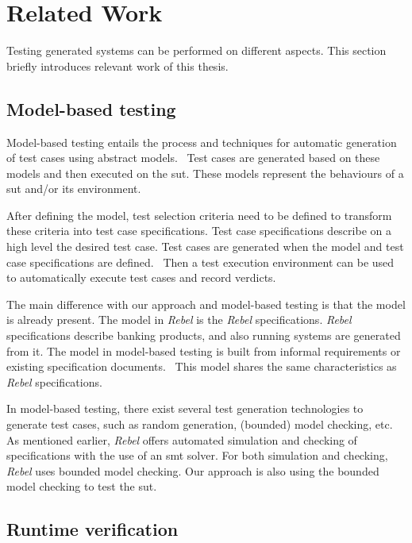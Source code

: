 \section{Related Work}

Testing generated systems can be performed on different aspects. This section
briefly introduces relevant work of this thesis.

\subsection*{Model-based testing}

Model-based testing entails the process and techniques for automatic generation
of test cases using abstract models.~\cite{utting2012taxonomy, tretmans2008model, dalal1999model}
Test cases are generated based on these models and then executed on the
\gls{sut}. These models represent the behaviours of a \gls{sut} and/or its
environment.~\cite{utting2012taxonomy, tretmans2008model}

After defining the model, test selection criteria need to be defined to
transform these criteria into test case specifications. Test case specifications
describe on a high level the desired test case. Test cases are generated when
the model and test case specifications are defined.~\cite{utting2012taxonomy}
Then a test execution environment can be used to automatically execute test
cases and record verdicts.

The main difference with our approach and model-based testing is that the model
is already present. The model in \textit{Rebel} is the \textit{Rebel}
specifications. \textit{Rebel} specifications describe banking products, and
also running systems are generated from it. The model in model-based testing is
built from informal requirements or existing specification
documents.~\cite[p.~2]{utting2012taxonomy} This model
shares the same characteristics as \textit{Rebel} specifications.

In model-based testing, there exist several test generation technologies to
generate test cases, such as random generation, (bounded) model checking,
etc.~\cite[p.~8-9]{utting2012taxonomy}
As mentioned earlier, \textit{Rebel} offers automated simulation and checking of
specifications with the use of an \gls{smt} solver. For both simulation and
checking, \textit{Rebel} uses bounded model checking. Our approach is also using
the bounded model checking to test the \gls{sut}.

\subsection*{Runtime verification}

